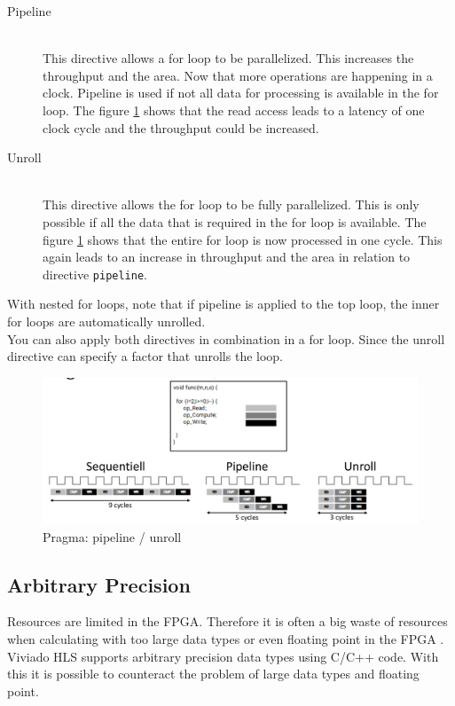 \begin{description}
\item[Pipeline]\hfill \\
This directive allows a for loop to be parallelized. This increases the throughput and the area. Now that more operations are happening in a clock.
Pipeline is used if not all data for processing is available in the for loop. The figure \ref{fig:p_pipeline_unroll} shows that the read access leads to a latency of one clock cycle and the throughput could be increased.
\item[Unroll]\hfill \\ 
This directive allows the for loop to be fully parallelized. This is only possible if all the data that is required in the for loop is available. The figure \ref{fig:p_pipeline_unroll} shows that the entire for loop is now processed in one cycle. This again leads to an increase in throughput and the area in relation to directive \texttt{pipeline}.
\end{description}

With nested for loops, note that if pipeline is applied to the top loop, the inner for loops are automatically unrolled. \\
You can also apply both directives in combination in a for loop. Since the unroll directive can specify a factor that unrolls the loop.

\begin{figure}[tb!]
    \centering
    \includegraphics[width=\textwidth]{images/theory/pipeline_unroll.png}
    \caption{Pragma: pipeline / unroll}
    \label{fig:p_pipeline_unroll}
\end{figure}

\subsection{Arbitrary Precision} \label{ch:ap}
Resources are limited in the FPGA. Therefore it is often a big waste of resources when calculating with too large data types or even floating point in the FPGA \cite{floating}. Viviado HLS supports arbitrary precision data types using C/C++ code. With this it is possible to counteract the problem of large data types and floating point. \\

